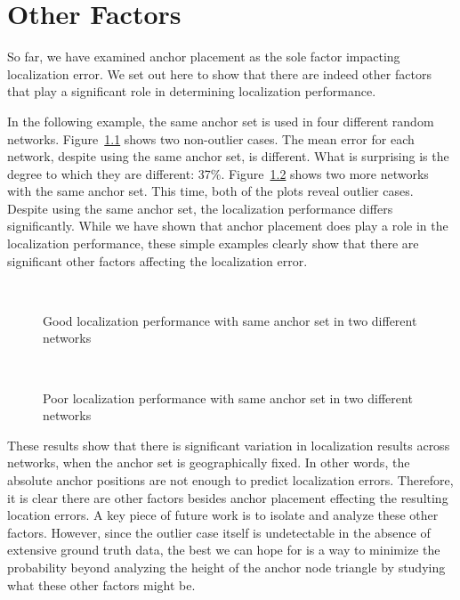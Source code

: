 \chapter{Other Factors}
\label{sec:otherfactors}

So far, we have examined anchor placement as the sole factor impacting localization error.  We set out here to show that there are indeed other factors that play a significant role in determining localization performance.

In the following example, the same anchor set is used in four different random networks.  Figure~\ref{fig:AS6good} shows two non-outlier cases.  The mean error for each network, despite using the same anchor set, is different.  What is surprising is the degree to which they are different: 37\%.  Figure~\ref{fig:AS6bad} shows two more networks with the same anchor set.  This time, both of the plots reveal outlier cases.  Despite using the same anchor set, the localization performance differs significantly.  While we have shown that anchor placement does play a role in the localization performance, these simple examples clearly show that there are significant other factors affecting the localization error.

\begin{figure}
  \centering
	\\
	\caption{Good localization performance with same anchor set in two different networks}
	\label{fig:AS6good}
\end{figure}

\begin{figure}
  \centering
\\
    \caption{Poor localization performance with same anchor set in two different networks}
	\label{fig:AS6bad}
\end{figure}

These results show that there is significant variation in localization results across networks, when the anchor set is geographically fixed.  In other words, the absolute anchor positions are not enough to predict localization errors.  Therefore, it is clear there are other factors besides anchor placement effecting the resulting location errors. A key piece of future work is to isolate and analyze these other factors.  However, since the outlier case itself is undetectable in the absence of extensive ground truth data, the best we can hope for is a way to minimize the probability beyond analyzing the height of the anchor node triangle by studying what these other factors might be.  


